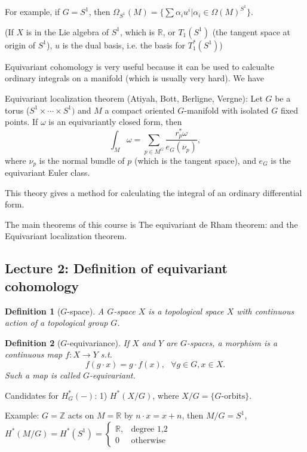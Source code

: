 \documentclass{article}
\theoremstyle{mystyle}
\newtheorem*{definition}{Definition}%
\theoremstyle{remark}
\numberwithin{equation}{section}
\begin{document}
For example, if $G = S^1$, then $\Omega_{S^1}(M) = \{ \sum \alpha_i u^i|\alpha_i \in \Omega(M)^{S^1}\}$.

(If $X$ is in the Lie algebra of $S^1$, which is $\mathbb{R}$, or $T_1(S^1)$ (the tangent space at origin of $S^1$), $u$ is the dual basis, i.e. the basis for $T_1^*(S^1)$)


Equivariant cohomology is very useful because it can be used to calcualte ordinary integrals on a manifold (which is usually very hard). We have

Equivariant localization theorem (Atiyah, Bott, Berligne, Vergne): Let $G$ be a torus ($S^1\times \cdots \times S^1)$ and $M$ a compact oriented $G$-manifold with isolated $G$ fixed points. If $\omega$ is an equivariantly closed form, then 
$$\int_M \omega =\sum_{p \in M^G} \frac{r_p^*\omega}{e_G(\nu_p)} ,$$
where $\nu_p$ is the normal bundle of $p$ (which is the tangent space), and $e_G$ is the equivariant Euler class.

This theory gives a method for calculating the integral of an ordinary differential form.

The main theorems of this course is The equivariant de Rham theorem: and the Equivariant localization theorem.

\subsection{Lecture 2: Definition of equivariant cohomology}

\begin{definition}[$G$-space] A $G$-space $X$ is a topological space $X$ with continuous action of a topological group $G$.
\end{definition}


\begin{definition}[$G$-equivariance] If $X$ and $Y$ are $G$-spaces, a \emph{morphism} is a continuous map $f\colon X\rightarrow Y$ s.t. 
$$f(g\cdot x) = g\cdot f(x), ~~~\forall g\in G,x\in X.$$
Such a map is called \emph{$G$-equivariant}.
\end{definition}

Candidates for $H^*_G(-)$: 1) $H^*(X/G)$, where $X/G = \{G\text{-orbits}\}$. 

Example: $G=\mathbb{Z}$ acts on $M=\mathbb{R}$ by $n\cdot x = x+n$, then $M/G = S^1$, $H^*(M/G) = H^*(S^1) = \left\{\begin{array}{ll} \mathbb{R}, &\text{degree 1,2}\\ 0& \text{otherwise}\end{array}\right.$
\end{document}
